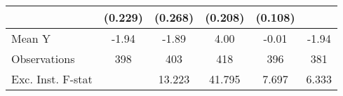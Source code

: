 {\begin{tabular}{l*{5}{c}}
            &     (0.229)         &     (0.268)         &     (0.208)         &     (0.108)         &                     \\
\midrule
Mean Y      &       -1.94         &       -1.89         &        4.00         &       -0.01         &       -1.94         \\
Observations&         398         &         403         &         418         &         396         &         381         \\
Exc. Inst. F-stat&                     &      13.223         &      41.795         &       7.697         &       6.333         \\
\bottomrule
\end{tabular}
}
